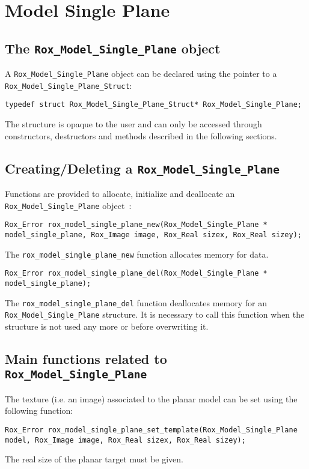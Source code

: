 \section{Model Single Plane}
\label{sec:model_single_plane}

\subsection{The {\tt Rox\_Model\_Single\_Plane} object}
\label{sse:model_single_plane_typedef}
A \lstinline$Rox_Model_Single_Plane$ object can be declared using the pointer to a \lstinline$Rox_Model_Single_Plane_Struct$: 

\begin{lstlisting}
typedef struct Rox_Model_Single_Plane_Struct* Rox_Model_Single_Plane;
\end{lstlisting}

The structure is opaque to the user and can only be accessed through constructors, destructors and methods described in the following sections.

\subsection{Creating/Deleting a {\tt Rox\_Model\_Single\_Plane}}
\label{sse:model_single_plane_newdel}

Functions are provided to allocate, initialize and deallocate an \lstinline$Rox_Model_Single_Plane$ object~:
\begin{lstlisting}
Rox_Error rox_model_single_plane_new(Rox_Model_Single_Plane * model_single_plane, Rox_Image image, Rox_Real sizex, Rox_Real sizey);
\end{lstlisting}
The \lstinline$rox_model_single_plane_new$ function allocates memory for data. \\ 

\begin{lstlisting}
Rox_Error rox_model_single_plane_del(Rox_Model_Single_Plane * model_single_plane);
\end{lstlisting}
The \lstinline$rox_model_single_plane_del$ function deallocates memory for an \lstinline$Rox_Model_Single_Plane$ structure. It is necessary to call this function when the
structure is not used any more or before overwriting it.

\subsection{Main functions related to {\tt Rox\_Model\_Single\_Plane}}
\label{sse:model_single_plane_functs}
The texture (i.e. an image) associated to the planar model can be set using the following function:
\begin{lstlisting}
Rox_Error rox_model_single_plane_set_template(Rox_Model_Single_Plane model, Rox_Image image, Rox_Real sizex, Rox_Real sizey); 
\end{lstlisting}
The real size of the planar target must be given.
